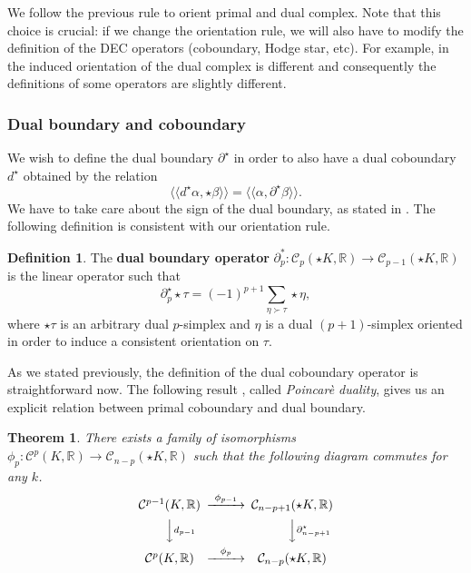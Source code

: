 \documentclass{article}
\theoremstyle{definition} %
\newtheorem{Def}{Definition}
\theoremstyle{plain} %
\newtheorem{Th}{Theorem}
\theoremstyle{remark} %
\newcommand{\rr}{\mathbb{R}}
\newcommand{\llangle}{\langle \langle}
\newcommand{\rrangle}{\rangle \rangle}
\begin{document}
We follow the previous rule to orient primal and dual complex.
Note that this choice is crucial: if we change the orientation rule, we will also have to modify the definition of the DEC operators (coboundary, Hodge star, etc). For example, in \cite{grady2010discrete} the induced orientation of the dual complex is different and consequently the definitions of some operators are slightly different.

\subsubsection{Dual boundary and coboundary}

We wish to define the dual boundary $\partial^{\star}$ in order to also have a dual coboundary $d^\star$ obtained by the relation
\begin{equation}
    \llangle d^\star \alpha, \star \beta \rrangle = \llangle \alpha, \partial^\star  \!\beta \rrangle.
\end{equation}
We have to take care about the sign of the dual boundary, as stated in \cite{schulz2020convergence}. The following definition \cite{schulz2020convergence} is consistent with our orientation rule.

\begin{Def}
        The \textbf{dual boundary operator} $\partial_p^*: \mathcal{C}_p(\star K, \rr) \rightarrow \mathcal{C}_{p-1}(\star K, \rr)$ is the linear operator such that
        \begin{equation}
            \partial_p^\star \star\!\tau = (-1)^{p+1} \sum_{\eta \succ \tau} \star \eta,
        \end{equation}
        where $\star \tau$ is an arbitrary dual $p$-simplex and $\eta$ is a dual $(p+1)$-simplex oriented in order to induce a consistent orientation on $\tau$.
\end{Def}

As we stated previously, the definition of the dual coboundary operator is straightforward now. The following result \cite{munkres2018elements, milicchio2008codimension}, called \textsl{Poincar\`e duality}, gives us an explicit relation between primal coboundary and dual boundary.

 \begin{Th}
        There exists a family of isomorphisms $\phi_p: \mathcal{C}^{p}(K, \rr) \rightarrow \mathcal{C}_{n-p}(\star K, \rr)$ such that the following diagram commutes for any $k$.
        $$\begin{CD}
        \mathcal{C}^{p-1}(K, \rr)   @>\phi_{p-1}>>   \mathcal{C}_{n-p+1}(\star K, \rr)\\
        @VVd_{p-1}V       @VV\partial_{n-p+1}^\star V\\
        \mathcal{C}^{p}(K, \rr)   @>\phi_p>>   \mathcal{C}_{n-p}(\star K, \rr)\\
        \end{CD}$$
\end{Th}
\end{document}
